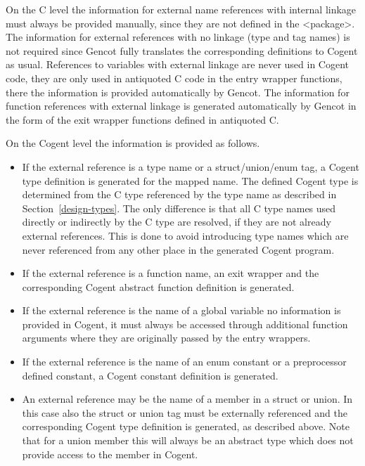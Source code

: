 On the C level the information for external name references with internal linkage must always be provided manually,
since they are not defined in the <package>. The information for external references with no linkage (type and tag names) is
not required since Gencot fully translates the corresponding definitions to Cogent as usual. References to variables
with external linkage are never used in Cogent code, they are only used in antiquoted C code in the entry wrapper functions,
there the information is provided automatically by Gencot. The information for function references with external linkage is 
generated automatically by Gencot in the form of the exit wrapper functions defined in antiquoted C. 

On the Cogent level the information is provided as follows.
\begin{itemize}
\item If the external reference is a type name or a struct/union/enum tag, a Cogent type definition is generated for the mapped name.
The defined Cogent type is determined
from the C type referenced by the type name as described in Section~\ref{design-types}. The only difference is that all C type
names used directly or indirectly by the C type are resolved, if they are not already external references. This is done to avoid 
introducing type names which are never referenced from any other place in the generated Cogent program. 
\item If the external reference is a function name, an exit wrapper and the corresponding Cogent abstract function 
definition is generated.
\item If the external reference is the name of a global variable no information is provided in Cogent, it must always be 
accessed through additional function arguments where they are originally passed by the entry wrappers.
\item If the external reference is the name of an enum constant or a preprocessor defined constant, a Cogent constant definition 
is generated.
\item An external reference may be the name of a member in a struct or union. In this case also the struct or union tag must
be externally referenced and the corresponding Cogent type definition is generated, as described above. Note that for a union
member this will always be an abstract type which does not provide access to the member in Cogent.
\end{itemize}
